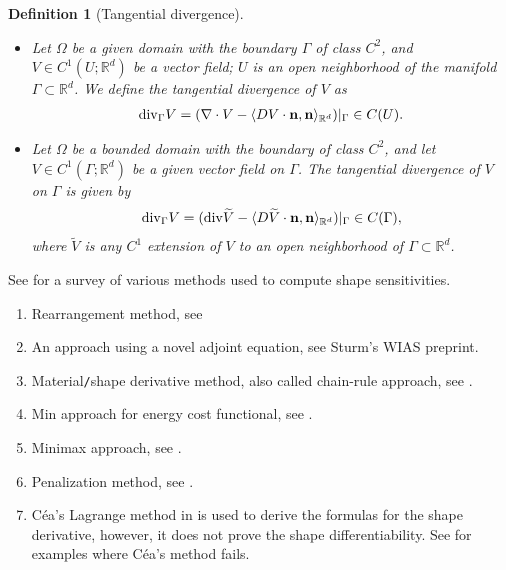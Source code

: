 \documentclass[oneside,11pt]{book}
\numberwithin{equation}{section}
\newtheorem{definition}{Definition}[section]
\begin{document}
\begin{definition}[Tangential divergence]
    \begin{itemize}
        \item[(i)] Let $\Omega$ be a given domain with the boundary $\Gamma$ of class $C^2$, and $V\in C^1(U;\mathbb{R}^d)$ be a vector field; $U$ is an open neighborhood of the manifold $\Gamma\subset\mathbb{R}^d$. We define the \emph{tangential divergence} of $V$ as
        \begin{align}
            \label{tangential div}
            {\rm div}_\Gamma V = (\nabla\cdot V - \langle DV\cdot{\bf n},{\bf n}\rangle_{\mathbb{R}^d})|_\Gamma\in C(U).
        \end{align}
        \item[(ii)] Let $\Omega$ be a bounded domain with the boundary of class $C^2$, and let $V\in C^1(\Gamma;\mathbb{R}^d)$ be a given vector field on $\Gamma$. The \emph{tangential divergence} of $V$ on $\Gamma$ is given by
        \begin{align}
            {\rm div}_\Gamma V = ({\rm div}\widetilde{V} - \langle D\widetilde{V}\cdot{\bf n},{\bf n}\rangle_{\mathbb{R}^d})|_\Gamma\in C(\Gamma),
        \end{align}
        where $\widetilde{V}$ is any $C^1$ extension of $V$ to an open neighborhood of $\Gamma\subset\mathbb{R}^d$.
    \end{itemize}
\end{definition}
See \cite{Sturm2015a, Sturm2015b} for a survey of various methods used to compute shape sensitivities.
\begin{enumerate}
    \item Rearrangement method, see  \cite{Ito_Kunisch_Peichl2008}
    \item An approach using a novel adjoint equation, see Sturm's WIAS preprint.
    \item Material\texttt{/}shape derivative method, also called chain-rule approach, see \cite{Sokolowski_Zolesio1992}.
    \item Min approach for energy cost functional, see \cite{Delfour2012}.
    \item Minimax approach, see \cite{Delfour_Zolesio1988a}.
    \item Penalization method, see \cite{Delfour_Zolesio1988b}.
    \item C\'ea's Lagrange method in \cite{Cea1986} is used to derive the formulas for the shape derivative, however, it does not prove the shape differentiability. See \cite{Pantz2005} for examples where C\'ea's method fails.
\end{enumerate}
\end{document}
